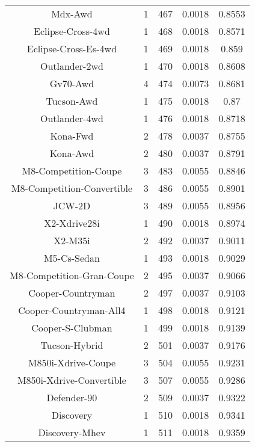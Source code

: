 \begin{center}
\begin{tabular}{|c|c|c|c|@{}c@{}|}
Mdx-Awd & 1 & 467 & 0.0018 & 0.8553 \\ 
Eclipse-Cross-4wd & 1 & 468 & 0.0018 & 0.8571 \\ 
Eclipse-Cross-Es-4wd & 1 & 469 & 0.0018 & 0.859 \\ 
Outlander-2wd & 1 & 470 & 0.0018 & 0.8608 \\ 
Gv70-Awd & 4 & 474 & 0.0073 & 0.8681 \\ 
Tucson-Awd & 1 & 475 & 0.0018 & 0.87 \\ 
Outlander-4wd & 1 & 476 & 0.0018 & 0.8718 \\ 
Kona-Fwd & 2 & 478 & 0.0037 & 0.8755 \\ 
Kona-Awd & 2 & 480 & 0.0037 & 0.8791 \\ 
M8-Competition-Coupe & 3 & 483 & 0.0055 & 0.8846 \\ 
M8-Competition-Convertible & 3 & 486 & 0.0055 & 0.8901 \\ 
JCW-2D & 3 & 489 & 0.0055 & 0.8956 \\ 
X2-Xdrive28i & 1 & 490 & 0.0018 & 0.8974 \\ 
X2-M35i & 2 & 492 & 0.0037 & 0.9011 \\ 
M5-Cs-Sedan & 1 & 493 & 0.0018 & 0.9029 \\ 
M8-Competition-Gran-Coupe & 2 & 495 & 0.0037 & 0.9066 \\ 
Cooper-Countryman & 2 & 497 & 0.0037 & 0.9103 \\ 
Cooper-Countryman-All4 & 1 & 498 & 0.0018 & 0.9121 \\ 
Cooper-S-Clubman & 1 & 499 & 0.0018 & 0.9139 \\ 
Tucson-Hybrid & 2 & 501 & 0.0037 & 0.9176 \\ 
M850i-Xdrive-Coupe & 3 & 504 & 0.0055 & 0.9231 \\ 
M850i-Xdrive-Convertible & 3 & 507 & 0.0055 & 0.9286 \\ 
Defender-90 & 2 & 509 & 0.0037 & 0.9322 \\ 
Discovery & 1 & 510 & 0.0018 & 0.9341 \\ 
Discovery-Mhev & 1 & 511 & 0.0018 & 0.9359 \\ 
\hline
\end{tabular}
\end{center} \vfill

